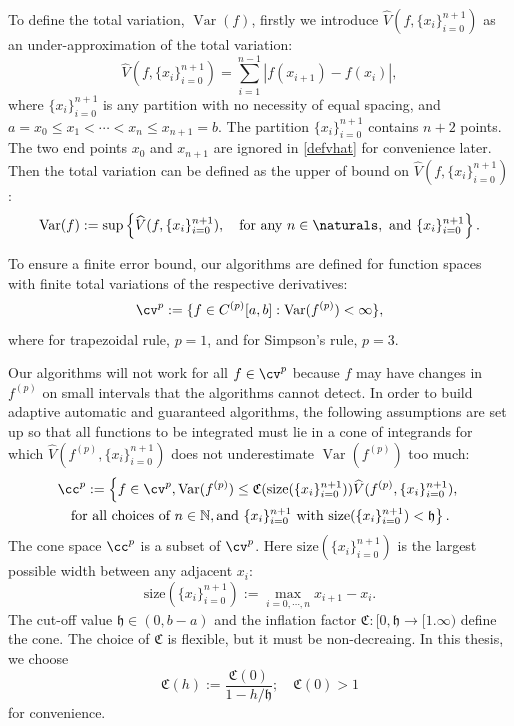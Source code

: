 \documentclass{iitthesis}
\DeclareMathOperator{\Var}{Var}
\theoremstyle{definition}
\theoremstyle{remark}
\begin{document}
To define the total variation, $\Var(f)$, firstly we introduce $\widehat{V}(f,\{x_i\}_{i=0}^{n+1})$ as an under-approximation of the total variation:
\begin{equation}\label{defvhat}
    \widehat{V}(f,\{x_i\}_{i=0}^{n+1})=\sum_{i=1}^{n-1}|f(x_{i+1})-f(x_{i})|,
\end{equation}
where $\{x_i\}_{i=0}^{n+1}$ is any partition with no necessity of equal spacing, and $a=x_{0}\leq x_{1}<\cdots<x_{n}\leq x_{n+1}=b$.
The partition $\{x_i\}_{i=0}^{n+1}$ contains $n+2$ points. The two end points $x_0$ and $x_{n+1}$ are ignored in \eqref{defvhat} for convenience later.
Then the total variation can be defined as the upper of bound on $\widehat{V}(f,\{x_i\}_{i=0}^{n+1})$:
\begin{equation}\label{defvar}
  \Var(f) := \sup \left\{\widehat{V}(f,\{x_i\}_{i=0}^{n+1}), \quad \text{for any }n \in \naturals, \text{ and } \{x_i\}_{i=0}^{n+1}\right\}.
\end{equation}

To ensure a finite error bound, our algorithms are defined for function spaces with finite total variations of the respective derivatives:
\begin{equation}\label{defspace}
 \cv^{p}:=\{f\in C^{(p)}[a,b]: \Var(f^{(p)}) < \infty \},
\end{equation}
where for trapezoidal rule, $p=1$, and for Simpson's rule, $p=3$.

Our algorithms will not work for all $f \in \cv^{p}$ because $f$ may have changes in $f^{(p)}$ on small intervals that the algorithms cannot detect. In order to build adaptive automatic and guaranteed algorithms, the following assumptions are set up so that all functions to be integrated must lie in a cone of integrands for which $\widehat{V}(f^{(p)},\{x_i\}_{i=0}^{n+1})$ does not underestimate $\Var(f^{(p)})$ too much:
\begin{multline}\label{defcone}
\cc^{p}:=\left\{f\in \cv^{p}, \Var(f^{(p)})\leq \mathfrak{C}(\text{size}(\{x_i\}_{i=0}^{n+1}))\widehat{V}(f^{(p)},\{x_i\}_{i=0}^{n+1}),\right.\\ \left.\text{for all choices of } n\in \mathbb{N}, \text{and }\{x_i\}_{i=0}^{n+1} \text{ with }\text{size}(\{x_i\}_{i=0}^{n+1})<\mathfrak{h}\right\}.
\end{multline}
The cone space $\cc^{p}$ is a subset of $\cv^{p}$. Here $\text{size}(\{x_i\}_{i=0}^{n+1})$ is the largest possible width between any adjacent $x_i$:
\begin{equation}\label{defsize}
  \text{size}(\{x_i\}_{i=0}^{n+1}):=\max_{i=0,\cdots, n} x_{i+1}-x_{i}.
\end{equation}
The cut-off value $\mathfrak{h} \in (0, b-a)$ and the inflation factor $\mathfrak{C}: [0,\mathfrak{h} \rightarrow [1.\infty)$ define the cone. The choice of $\mathfrak{C}$ is flexible, but it must be non-decreaing. In this thesis, we choose
\begin{equation}\label{definflationfactor}
  \mathfrak{C}(h):=\frac{\mathfrak{C}(0)}{1-h/\mathfrak{h}}; \quad \mathfrak{C}(0)>1
\end{equation}
for convenience.
\end{document}
